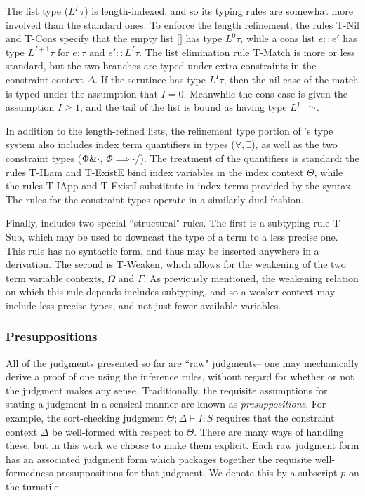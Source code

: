 The list type ($L^I \, \tau$) is length-indexed, and so its typing rules are somewhat more involved than the standard ones. To enforce the length refinement, the rules T-Nil and T-Cons specify that the empty list $\texttt{[]}$ has type $L^0 \tau$, while a cons list $e :: e'$ has type $L^{I+1} \tau$ for $e : \tau$ and $e' :: L^I \tau$. The list elimination rule T-Match is more or less standard, but the two branches are typed under extra constraints in the constraint context $\Delta$. If the scrutinee has type $L^I \tau$, then the nil case of the match is typed under the assumption that $I = 0$. Meanwhile the cons case is given the assumption $I \geq 1$, and the tail of the list is bound as having type $L^{I-1} \tau$.

In addition to the length-refined lists, the refinement type portion of \dlambdaamor's type system also includes index term quantifiers in types ($\forall,\exists$), as well as the two constraint types ($\Phi \& \cdot$, $\Phi \implies \cdot$/).  The treatment of the quantifiers is standard: the rules T-ILam and T-ExistE bind index variables in the index context $\Theta$, while the rules T-IApp and T-ExistI substitute in index terms provided by the syntax. The rules for the constraint types operate in a similarly dual fashion.

Finally, \dlambdaamor includes two special ``structural" rules. The first is a subtyping rule T-Sub, which may be used to downcast the type of a term to a less precise one. This rule has no syntactic form, and thus may be inserted anywhere in a derivation. The second is T-Weaken, which allows for the weakening of the two term variable contexts, $\Omega$ and $\Gamma$. As previously mentioned, the weakening relation on which this rule depends includes subtyping, and so a weaker context may include less precise types, and not just fewer available variables.


\subsubsection{Presuppositions}
All of the judgments presented so far are ``raw" judgments-- one may mechanically derive a proof of one using the inference rules, without regard for whether or not the judgment makes any sense. Traditionally, the requisite assumptions for stating a judgment in a sensical manner are known as \textit{presuppositions}. For example, the sort-checking judgment $\Theta ; \Delta \vdash I : S$ requires that the constraint context $\Delta$ be well-formed with respect to $\Theta$. There are many ways of handling these, but in this work we choose to make them explicit. Each raw judgment form has an associated judgment form which packages together the requisite well-formedness presuppositions for that judgment. We denote this by a subscript $p$ on the turnstile.

